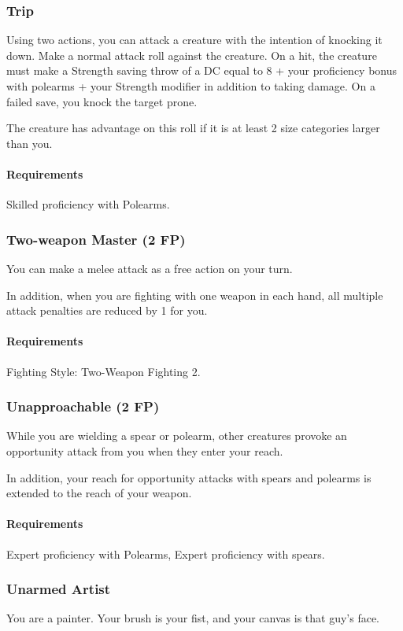 \subsubsection{Trip} \label{feat::trip}
    Using two actions, you can attack a creature with the intention of knocking it down.
    Make a normal attack roll against the creature.
    On a hit, the creature must make a Strength saving throw of a DC equal to 8 + your proficiency bonus with polearms + your Strength modifier in addition to taking damage.
    On a failed save, you knock the target prone.

    The creature has advantage on this roll if it is at least 2 size categories larger than you.
    \paragraph{Requirements} Skilled proficiency with Polearms.
\subsubsection{Two-weapon Master (2 FP)} \label{feat::twoweaponmaster}
    You can make a melee attack as a free action on your turn.

    In addition, when you are fighting with one weapon in each hand, all multiple attack penalties are reduced by 1 for you.
    \paragraph{Requirements} Fighting Style: Two-Weapon Fighting 2.
\subsubsection{Unapproachable (2 FP)} \label{feat::unapproachable}
    While you are wielding a spear or polearm, other creatures provoke an opportunity attack from you when they enter your reach.

    In addition, your reach for opportunity attacks with spears and polearms is extended to the reach of your weapon.
    \paragraph{Requirements} Expert proficiency with Polearms, Expert proficiency with spears.
\subsubsection{Unarmed Artist} \label{feat::unarmedartist}
    You are a painter.
    Your brush is your fist, and your canvas is that guy's face.

